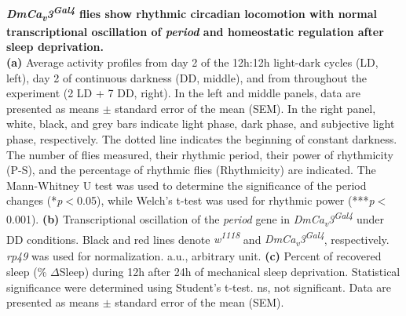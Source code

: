 \label{fig:4}
\textbf{ \emph{DmCa\textsubscript{v}3\textsuperscript{Gal4}} flies show rhythmic circadian locomotion with normal transcriptional oscillation of \emph{period} and homeostatic regulation after sleep deprivation.}
\\
\textbf{(a)} Average activity profiles from day 2 of the 12h:12h light-dark cycles (LD, left), day 2 of continuous darkness (DD, middle), and from throughout the experiment (2 LD + 7 DD, right).
In the left and middle panels, data are presented as means $\pm$ standard error of the mean (SEM).
In the right panel, white, black, and grey bars indicate light phase, dark phase, and subjective light phase, respectively.
The dotted line indicates the beginning of constant darkness. 
The number of flies measured, their rhythmic period, their power of rhythmicity (P-S), and the percentage of rhythmic flies (Rhythmicity) are indicated.
The Mann-Whitney U test was used to determine the significance of the period changes (*\emph{p}$<$0.05), while Welch's t-test was used for rhythmic power (***\emph{p}$<$0.001). 
\textbf{(b)} Transcriptional oscillation of the \emph{period} gene in \emph{DmCa\textsubscript{v}3\textsuperscript{Gal4}} under DD conditions. Black and red lines denote \emph{w\textsuperscript{1118}} and \emph{DmCa\textsubscript{v}3\textsuperscript{Gal4}}, respectively.
\emph{rp49} was used for normalization.
a.u., arbitrary unit.
\textbf{(c)} Percent of recovered sleep (\% $\Delta$Sleep) during 12h after 24h of mechanical sleep deprivation. 
Statistical significance were determined using Student's t-test. 
ns, not significant.
Data are presented as means $\pm$ standard error of the mean (SEM).
